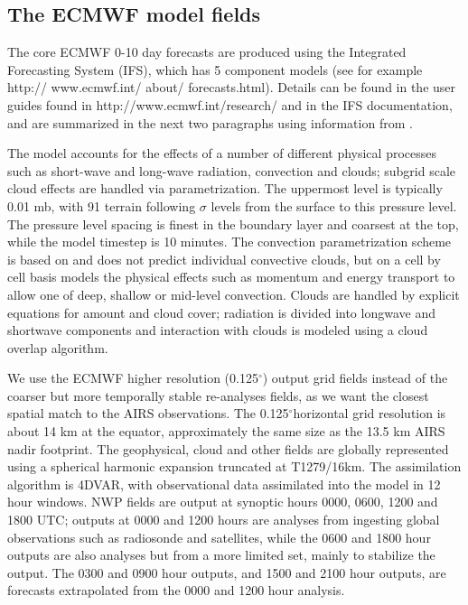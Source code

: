 \documentclass[agupp]{aguplus}              %
\newcommand{\mydeg}{\mbox{$^\circ$}}
\begin{document}
\begin{article}
\subsection{The ECMWF model fields}
\label{ECMWF_cloud}

The core ECMWF 0-10 day forecasts are
produced using the Integrated Forecasting System (IFS), which has 5
component models (see for example http:// www.ecmwf.int/ about/
forecasts.html). Details can be found in the user
guides found in http://www.ecmwf.int/research/ and in the IFS
documentation, and are summarized in the next two paragraphs using
information from \citep{upp:05,dee:11*2}.

The model accounts for the effects of a number of different physical
processes such as short-wave and long-wave radiation, convection and
clouds; subgrid scale cloud effects are handled via parametrization.
The uppermost level is typically 0.01 mb, with 91 terrain following
$\sigma$ levels from the surface to this pressure level. The pressure
level spacing is finest in the boundary layer and coarsest at the top,
while the model timestep is 10 minutes. The convection parametrization
scheme is based on \citep{tie:89} and does not predict individual
convective clouds, but on a cell by cell basis models the physical
effects such as momentum and energy transport to allow one of deep,
shallow or mid-level convection. Clouds are handled by
explicit equations for amount and cloud cover;
radiation is divided into longwave and shortwave components and
interaction with clouds is modeled using a cloud overlap algorithm.

We use the ECMWF higher resolution (0.125\mydeg) output grid fields
instead of the coarser but more temporally stable re-analyses fields,
as we want the closest spatial match to the AIRS
observations. The 0.125\mydeg horizontal grid resolution is about 14
km at the equator, approximately the same size as the 13.5 km AIRS
nadir footprint. The geophysical, cloud and other fields are globally
represented using a spherical harmonic expansion truncated at
T1279/16km. The assimilation algorithm is 4DVAR, with observational
data assimilated into the model in 12 hour windows. NWP fields are
output at synoptic hours 0000, 0600, 1200 and 1800 UTC; outputs at
0000 and 1200 hours are analyses from ingesting global observations
such as radiosonde and satellites, while the 0600 and 1800 hour
outputs are also analyses but from a more limited set, mainly to
stabilize the output. The 0300 and 0900 hour outputs, and 1500 and
2100 hour outputs, are forecasts extrapolated from the 0000 and 1200
hour analysis.


\end{article}
\end{document}
